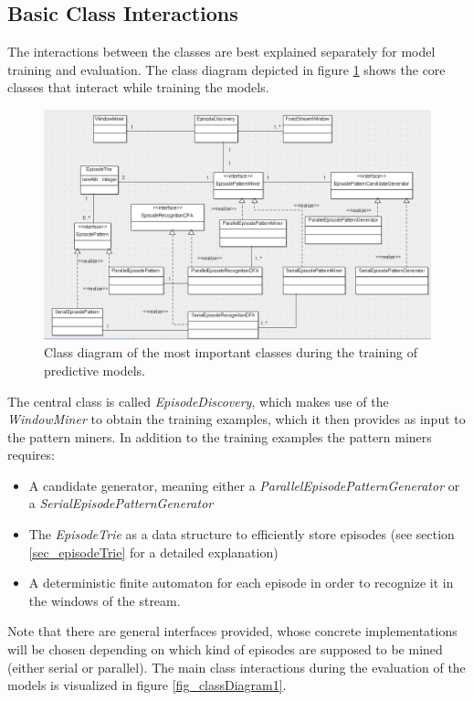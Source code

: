 \subsection{Basic Class Interactions}
The interactions between the classes are best explained separately for model training and evaluation. The class diagram depicted in figure \ref{fig_classDiagramTraining} shows the core classes that interact while training the models.

\begin{figure}[h]
	\centering
  	\includegraphics[width=\textwidth]{classDiagramTraining}
	\caption[Class Diagram: Training Phase]{Class diagram of the most important classes during the training of predictive models.}
	\label{fig_classDiagramTraining}
\end{figure}

The central class is called \textit{EpisodeDiscovery}, which makes use of the \textit{WindowMiner} to obtain the training examples, which it then provides as input to the pattern miners. In addition to the training examples the pattern miners requires:

\begin{itemize}
	\item A candidate generator, meaning either a \textit{ParallelEpisodePatternGenerator} or a \textit{SerialEpisodePatternGenerator}
	\item The \textit{EpisodeTrie} as a data structure to efficiently store episodes (see section \ref{sec_episodeTrie} for a detailed explanation)
	\item A deterministic finite automaton for each episode in order to recognize it in the windows of the stream. 
\end{itemize}

Note that there are general interfaces provided, whose concrete implementations will be chosen depending on which kind of episodes are supposed to be mined (either serial or parallel). The main class interactions during the evaluation of the models is visualized in figure \ref{fig_classDiagram1}.

